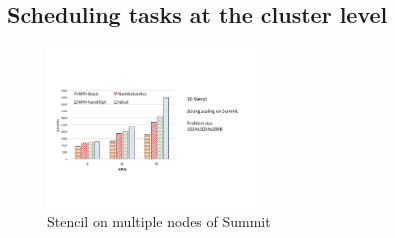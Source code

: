 \subsection{Scheduling tasks at the cluster level}


\begin{figure}[htb]
\centering
\includegraphics[width=0.49\textwidth]{figures/stencil_multiple_nodes_summit.pdf}
\caption{Stencil on multiple nodes of Summit}
\label{stencil_multiple_nodes}
\end{figure}




